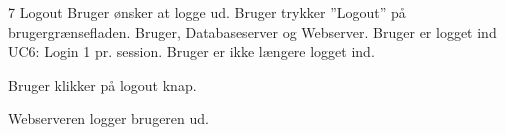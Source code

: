
\uchead
	{7}
	{Logout}
	{Bruger ønsker at logge ud.}
	{Bruger trykker ''Logout'' på brugergrænsefladen.}
	{Bruger, Databaseserver og Webserver.}
	{Bruger er logget ind}
	{UC6: Login}
	{1 pr. session.}
	{Bruger er ikke længere logget ind.}

\item Bruger klikker på logout knap.

\item Webserveren logger brugeren ud.

\ucdescriptionend

		
